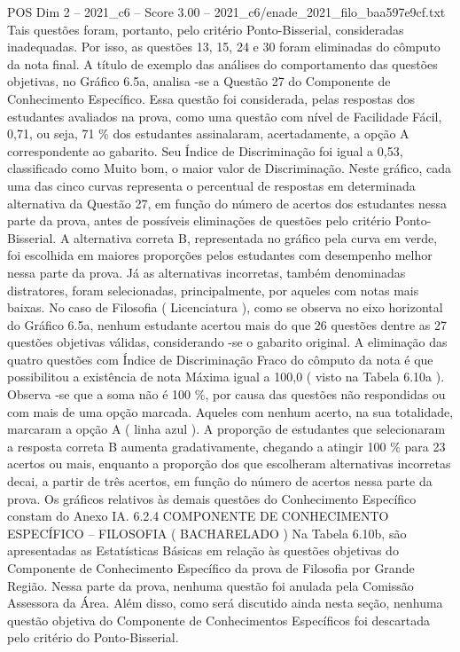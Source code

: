 \begin{textsample}{POS Dim 2 – 2021\_c6 – Score 3.00 – 2021\_c6/enade\_2021\_filo\_baa597e9cf.txt}
Tais questões foram, portanto, pelo critério Ponto-Bisserial, consideradas inadequadas.
Por isso, as questões 13, 15, 24 e 30 foram eliminadas do cômputo da nota final.
A título de exemplo das análises do comportamento das questões objetivas, no Gráfico 6.5a, analisa -se a Questão 27 do Componente de Conhecimento Específico.
Essa questão foi considerada, pelas respostas dos estudantes avaliados na prova, como uma questão com nível de Facilidade Fácil, 0,71, ou seja, 71 \% dos estudantes assinalaram, acertadamente, a opção A correspondente ao gabarito.
Seu Índice de Discriminação foi igual a 0,53, classificado como Muito bom, o maior valor de Discriminação.
Neste gráfico, cada uma das cinco curvas representa o percentual de respostas em determinada alternativa da Questão 27, em função do número de acertos dos estudantes nessa parte da prova, antes de possíveis eliminações de questões pelo critério Ponto-Bisserial.
A alternativa correta B, representada no gráfico pela curva em verde, foi escolhida em maiores proporções pelos estudantes com desempenho melhor nessa parte da prova.
Já as alternativas incorretas, também denominadas distratores, foram selecionadas, principalmente, por aqueles com notas mais baixas.
No caso de Filosofia ( Licenciatura ), como se observa no eixo horizontal do Gráfico 6.5a, nenhum estudante acertou mais do que 26 questões dentre as 27 questões objetivas válidas, considerando -se o gabarito original.
A eliminação das quatro questões com Índice de Discriminação Fraco do cômputo da nota é que possibilitou a existência de nota Máxima igual a 100,0 ( visto na Tabela 6.10a ).
Observa -se que a soma não é 100 \%, por causa das questões não respondidas ou com mais de uma opção marcada.
Aqueles com nenhum acerto, na sua totalidade, marcaram a opção A ( linha azul ).
A proporção de estudantes que selecionaram a resposta correta B aumenta gradativamente, chegando a atingir 100 \% para 23 acertos ou mais, enquanto a proporção dos que escolheram alternativas incorretas decai, a partir de três acertos, em função do número de acertos nessa parte da prova.
Os gráficos relativos às demais questões do Conhecimento Específico constam do Anexo IA. 6.2.4 COMPONENTE DE CONHECIMENTO ESPECÍFICO – FILOSOFIA ( BACHARELADO ) Na Tabela 6.10b, são apresentadas as Estatísticas Básicas em relação às questões objetivas do Componente de Conhecimento Específico da prova de Filosofia por Grande Região.
Nessa parte da prova, nenhuma questão foi anulada pela Comissão Assessora da Área.
Além disso, como será discutido ainda nesta seção, nenhuma questão objetiva do Componente de Conhecimentos Específicos foi descartada pelo critério do Ponto-Bisserial.

\end{textsample}

